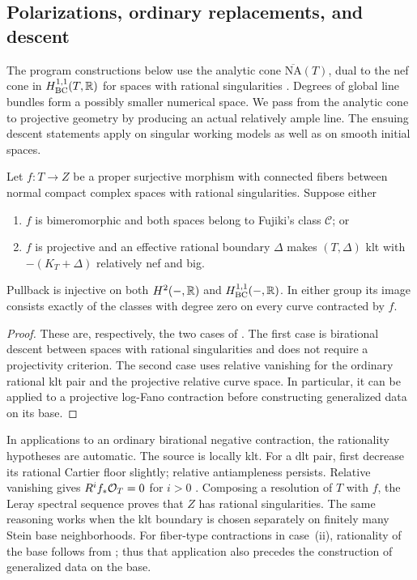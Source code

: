 \subsection{Polarizations, ordinary replacements, and descent}
\label{prog:foundations}

The program constructions below use the analytic cone
\(\overline{\mathrm{NA}}(T)\), dual to the nef cone in
\(H^{1,1}_{\mathrm{BC}}(T,\mathbb R)\) for spaces with rational singularities
\cite[Proposition~2.4]{DHP}. Degrees of global line bundles form a
possibly smaller numerical space. We pass from the analytic cone to
projective geometry by producing an actual relatively ample line.
The ensuing descent statements apply on singular working models as
well as on smooth initial spaces.

\begin{lemma}
\label{prog:bc-descent}
Let \(f:T\to Z\) be a proper surjective morphism with connected fibers
between normal compact complex spaces with rational singularities.
Suppose either
\begin{enumerate}
\item \(f\) is bimeromorphic and both spaces belong to Fujiki's class
\(\mathcal C\); or
\item \(f\) is projective and an effective rational boundary
\(\Delta\) makes \((T,\Delta)\) klt with
\(-(K_T+\Delta)\) relatively nef and big.
\end{enumerate}
Pullback is injective on both \(H^2(-,\mathbb R)\) and
\(H^{1,1}_{\mathrm{BC}}(-,\mathbb R)\). In either group its image consists exactly
of the classes with degree zero on every curve contracted by \(f\).
\end{lemma}

\begin{proof}
These are, respectively, the two cases of
\cite[Lemma~2.6(1),(2)]{DH2024}. The first case is birational descent
between spaces with rational singularities and does not require a
projectivity criterion. The second case uses relative vanishing for
the ordinary rational klt pair and the projective relative curve
space. In particular, it can be applied to a projective log-Fano
contraction before constructing generalized data on its base.
\end{proof}

In applications to an ordinary birational negative contraction,
the rationality hypotheses are automatic. The source is locally klt.
For a dlt pair, first decrease its rational Cartier floor slightly;
relative antiampleness persists. Relative vanishing gives
\(R^if_*\mathcal O_T=0\) for \(i>0\)
\cite[Theorem~5.2]{FujinoAnalyticBCHM}. Composing a resolution of \(T\)
with \(f\), the Leray spectral sequence proves that \(Z\) has rational
singularities. The same reasoning works when the klt boundary is
chosen separately on finitely many Stein base neighborhoods. For
fiber-type contractions in case~(ii), rationality of the base follows
from \cite[Lemma~8.8(i)]{DHP}; thus that application also precedes
the construction of generalized data on the base.

